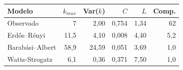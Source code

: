 \begin{tabular}{lrrrrr}
  \toprule
  Modelo & $k_{max}$ & Var($k$) & $C$ & $L$ & Comp. \\
  \midrule
  Observado & 7 & 2,00 & 0,754 & 1,34 & 62 \\
  Erdős–Rényi & 11,5 & 4,10 & 0,008 & 4,40 & 5,2 \\
  Barabási–Albert & 58,9 & 24,59 & 0,051 & 3,69 & 1,0 \\
  Watts-Strogatz & 6,1 & 0,36 & 0,371 & 7,50 & 1,0 \\
  \bottomrule
\end{tabular}
